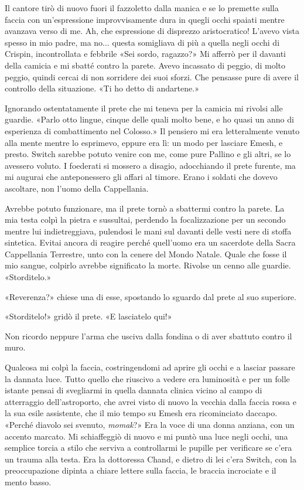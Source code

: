 Il cantore tirò di nuovo fuori il fazzoletto dalla manica e se lo
premette sulla faccia con un'espressione improvvisamente dura in quegli
occhi spaiati mentre avanzava verso di me. Ah, che espressione di
disprezzo aristocratico! L'avevo vista spesso in mio padre, ma no...
questa somigliava di più a quella negli occhi di Crispin, incontrollata
e febbrile «Sei sordo, ragazzo?» Mi afferrò per il {davanti} della
camicia e mi sbatté contro la parete. Avevo incassato di peggio, di
molto peggio, quindi cercai di non sorridere dei suoi sforzi. Che
pensasse pure di avere il controllo della situazione. «Ti ho detto di
andartene.»

Ignorando ostentatamente il prete che mi teneva per la camicia mi
rivolsi alle guardie. «Parlo otto lingue, cinque delle quali molto bene,
e ho quasi un anno di esperienza di combattimento nel Colosso.» Il
pensiero mi era letteralmente venuto alla mente mentre lo esprimevo,
eppure era lì: un modo per lasciare Emesh, e presto. Switch sarebbe
potuto venire con me, come pure Pallino e gli altri, se lo avessero
voluto. I foederati si mossero a disagio, adocchiando il prete furente,
ma mi augurai che anteponessero gli affari al timore. Erano i soldati
che dovevo ascoltare, non l'uomo della Cappellania.

Avrebbe potuto funzionare, ma il prete tornò a sbattermi contro la
parete. La mia testa colpì la pietra e sussultai, perdendo la
focalizzazione per un secondo mentre lui indietreggiava, pulendosi le
mani sul davanti delle vesti nere di stoffa sintetica. Evitai ancora di
reagire perché quell'uomo era un sacerdote della Sacra Cappellania
Terrestre, unto con la cenere del Mondo Natale. Quale che fosse il mio
sangue, colpirlo avrebbe significato la morte. Rivolse un cenno alle
guardie. «Storditelo.»

«Reverenza?» chiese una di esse, spostando lo sguardo dal prete al suo
superiore.

«Storditelo!» gridò il prete. «E lasciatelo qui!»

Non ricordo neppure l'arma che usciva dalla fondina o di aver sbattuto
contro il muro.

\begin{figure}
	\centering
	\def\svgwidth{\columnwidth}
	\scalebox{0.2}{}
\end{figure}

Qualcosa mi colpì la faccia, costringendomi ad aprire gli occhi e a
lasciar passare la dannata luce. Tutto quello che riuscivo a vedere era
luminosità e per un folle istante pensai di svegliarmi in quella dannata
clinica vicino al campo di atterraggio dell'astroporto, che avrei visto
di nuovo la vecchia dalla faccia rossa e la sua esile assistente, che il
mio tempo su Emesh era ricominciato daccapo. «Perché diavolo sei
svenuto, \emph{momak}?» Era la voce di una donna anziana, con un accento
marcato. Mi schiaffeggiò di nuovo e mi puntò una luce negli occhi, una
semplice torcia a stilo che serviva a controllarmi le pupille per
verificare se c'era un trauma alla testa. Era la dottoressa Chand, e
dietro di lei c'era Switch, con la preoccupazione dipinta a chiare
lettere sulla faccia, le braccia incrociate e il mento basso.

